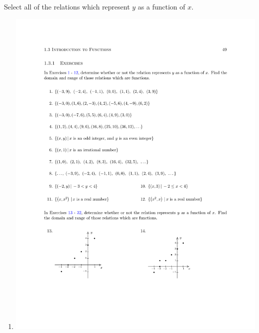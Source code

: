 \documentclass{ximera}
\author{Elizabeth Miller}
\begin{document}
\licenseSZ
\begin{exercise}
Select all of the relations which represent  $y$ as a function of $x$.
\begin{enumerate}
  \item{\includegraphics{WiaFgraphs1-1.pdf}}

\end{enumerate}
\end{exercise}
\end{document}
